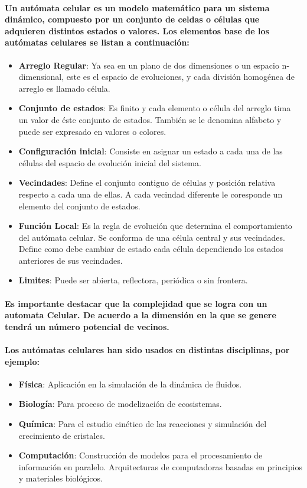       \paragraph{Un autómata celular es un modelo matemático para un sistema dinámico, compuesto por un conjunto de celdas o células que adquieren distintos estados o valores. Los elementos base de los autómatas celulares se listan a continuación:}
      \begin{itemize}
        \item{\textbf{Arreglo Regular}: Ya sea en un plano de dos dimensiones o un espacio n-dimensional, este es el espacio de evoluciones, y cada división homogénea de arreglo es llamado célula.}
        \item{\textbf{Conjunto de estados}: Es finito y cada elemento o célula del arreglo tima un valor de éste conjunto de estados. También se le denomina alfabeto y puede ser expresado en valores o colores.}
        \item{\textbf{Configuración inicial}: Consiste en asignar un estado a cada una de las células del espacio de evolución inicial del sistema.}
        \item{\textbf{Vecindades}: Define el conjunto contiguo de células y posición relativa respecto a cada una de ellas. A cada vecindad diferente le coresponde un elemento del conjunto de estados.}
        \item{\textbf{Función Local}: Es la regla de evolución que determina el comportamiento del autómata celular. Se conforma de una célula central y sus vecindades. Define como debe cambiar de estado cada célula dependiendo los estados anteriores de sus vecindades.}
        \item{\textbf{Limites}: Puede ser abierta, reflectora, periódica o sin frontera.}
      \end{itemize}
    \paragraph{Es importante destacar que la complejidad que se logra con un automata Celular. De acuerdo a la dimensión en la que se genere tendrá un número potencial de vecinos.}
    \paragraph{Los autómatas celulares han sido usados en distintas disciplinas, por ejemplo:}
      \begin{itemize}
        \item{\textbf{Física}: Aplicación en la simulación de la dinámica de fluidos.}
        \item{\textbf{Biología}: Para proceso de modelización de ecosistemas.}
        \item{\textbf{Química}: Para el estudio cinético de las reacciones y simulación del crecimiento de cristales.}
        \item{\textbf{Computación}: Construcción de modelos para el procesamiento de información en paralelo. Arquitecturas de computadoras basadas en principios y materiales biológicos. \cite{10}}
      \end{itemize}
